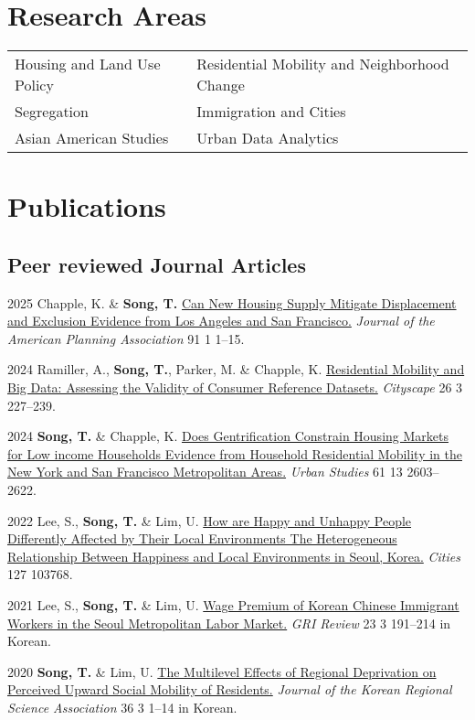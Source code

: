 \documentclass[11pt,letterpaper]{article}
\begin{document}
\section{Research Areas}
\begin{tabular}{@{}p{} p{}@{}}
Housing and Land Use Policy & Residential Mobility and Neighborhood Change\\
Segregation & Immigration and Cities\\
Asian American Studies & Urban Data Analytics
\end{tabular}

\section{Publications}

\subsection{Peer reviewed Journal Articles}
\begin{tablist}
  \item[2025] \tab{}Chapple, K. \& \textbf{Song, T.} \href{https://doi.org/10.1080/01944363.2024.2319293}{Can New Housing Supply Mitigate Displacement and Exclusion Evidence from Los Angeles and San Francisco.} \emph{Journal of the American Planning Association} 91 1 1–15.
  \item[2024] \tab{}Ramiller, A., \textbf{Song, T.}, Parker, M. \& Chapple, K. \href{https://www.jstor.org/stable/48799257}{Residential Mobility and Big Data: Assessing the Validity of Consumer Reference Datasets.} \emph{Cityscape} 26 3 227–239.
  \item[2024] \tab{}\textbf{Song, T.} \& Chapple, K. \href{https://doi.org/10.1177/00420980241244699}{Does Gentrification Constrain Housing Markets for Low income Households Evidence from Household Residential Mobility in the New York and San Francisco Metropolitan Areas.} \emph{Urban Studies} 61 13 2603–2622.
  \item[2022] \tab{}Lee, S., \textbf{Song, T.} \& Lim, U. \href{https://doi.org/10.1016/j.cities.2022.103768}{How are Happy and Unhappy People Differently Affected by Their Local Environments The Heterogeneous Relationship Between Happiness and Local Environments in Seoul, Korea.} \emph{Cities} 127 103768.
  \item[2021] \tab{}Lee, S., \textbf{Song, T.} \& Lim, U. \href{https://www.dbpia.co.kr/Journal/articleDetail?nodeId=NODE11025769}{Wage Premium of Korean Chinese Immigrant Workers in the Seoul Metropolitan Labor Market.} \emph{GRI Review} 23 3 191–214 in Korean.
  \item[2020] \tab{}\textbf{Song, T.} \& Lim, U. \href{https://www.koreascience.or.kr/article/JAKO202030161655441.page}{The Multilevel Effects of Regional Deprivation on Perceived Upward Social Mobility of Residents.} \emph{Journal of the Korean Regional Science Association} 36 3 1–14 in Korean.
\end{tablist}
\end{document}
